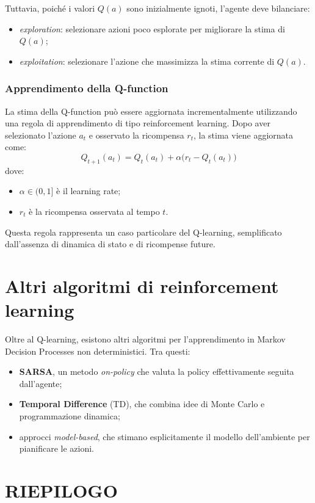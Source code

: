 \documentclass[a4paper,12pt]{report}
\begin{document}
Tuttavia, poiché i valori $Q(a)$ sono inizialmente ignoti, l’agente deve
bilanciare:
\begin{itemize}
\item \emph{exploration}: selezionare azioni poco esplorate per migliorare
la stima di $Q(a)$;
\item \emph{exploitation}: selezionare l’azione che massimizza la stima
corrente di $Q(a)$.
\end{itemize}

\subsubsection{Apprendimento della Q-function}

La stima della Q-function può essere aggiornata incrementalmente
utilizzando una regola di apprendimento di tipo reinforcement learning.
Dopo aver selezionato l’azione $a_t$ e osservato la ricompensa $r_t$,
la stima viene aggiornata come:
\[
Q_{t+1}(a_t) = Q_t(a_t) + \alpha \big( r_t - Q_t(a_t) \big)
\]
dove:
\begin{itemize}
\item $\alpha \in (0,1]$ è il learning rate;
\item $r_t$ è la ricompensa osservata al tempo $t$.
\end{itemize}

Questa regola rappresenta un caso particolare del Q-learning,
semplificato dall’assenza di dinamica di stato e di ricompense future.

\section{Altri algoritmi di reinforcement learning}

Oltre al Q-learning, esistono altri algoritmi per l'apprendimento in
Markov Decision Processes non deterministici. Tra questi:
\begin{itemize}
    \item \textbf{SARSA}, un metodo \emph{on-policy} che valuta la policy
    effettivamente seguita dall'agente;
    \item \textbf{Temporal Difference} (TD), che combina idee di Monte Carlo
    e programmazione dinamica;
    \item approcci \emph{model-based}, che stimano esplicitamente il
    modello dell'ambiente per pianificare le azioni.
\end{itemize}

\newpage
\section*{RIEPILOGO}
\end{document}
